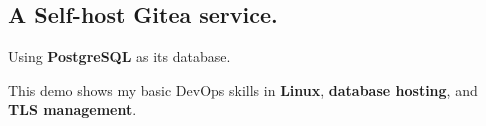 \subsection{{A Self-host Gitea service.}}
\begin{zitemize}
\item Using \textbf{PostgreSQL} as its database.
\item This demo shows my basic DevOps skills in \textbf{Linux}, \textbf{database hosting}, and \textbf{TLS management}.

\end{zitemize}








